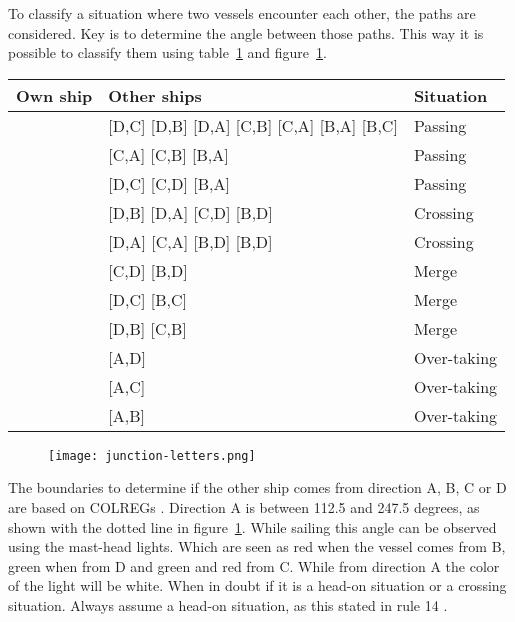 To classify a situation where two vessels encounter each other, the paths are considered. Key is to determine the angle between those paths. This way it is possible to classify them using table~\ref{tab:scenarios-standard} and figure~\ref{fig:junction-letters}.

\begin{table}[p]
	\centering
	\begin{tabular}{l|l|l}
		Own ship & Other ships & Situation\\
		\hline
		\big[A,D\big] & [D,C] [D,B] [D,A] [C,B] [C,A] [B,A] [B,C] & Passing \\
		\big[A,C\big] & [C,A] [C,B] [B,A] & Passing \\
		\big[A,B\big] & [D,C] [C,D] [B,A] & Passing \\
		\big[A,C\big] & [D,B] [D,A] [C,D] [B,D] & Crossing \\
		\big[A,B\big] & [D,A] [C,A] [B,D] [B,D] & Crossing \\
		\big[A,D\big] & [C,D] [B,D] & Merge \\
		\big[A,C\big] & [D,C] [B,C] & Merge \\
		\big[A,B\big] & [D,B] [C,B] & Merge \\
		\big[A,D\big] & [A,D] & Over-taking \\
		\big[A,C\big] & [A,C] & Over-taking \\
		\big[A,B\big] & [A,B] & Over-taking \\
	\end{tabular}
	\label{tab:scenarios-standard}
\end{table}

\begin{figure}[p]
	\centering
	\texttt{[image: junction-letters.png]}
	\label{fig:junction-letters}
\end{figure}

The boundaries to determine if the other ship comes from direction A, B, C or D are based on \ac{COLREGs} \cite{IMO1972}. Direction A is between 112.5 and 247.5 degrees, as shown with the dotted line in figure~\ref{fig:junction-letters}. While sailing this angle can be observed using the mast-head lights. Which are seen as red when the vessel comes from B, green when from D and green and red from C. While from direction A the color of the light will be white. When in doubt if it is a head-on situation or a crossing situation. Always assume a head-on situation, as this stated in rule 14 \cite{IMO1972}.

